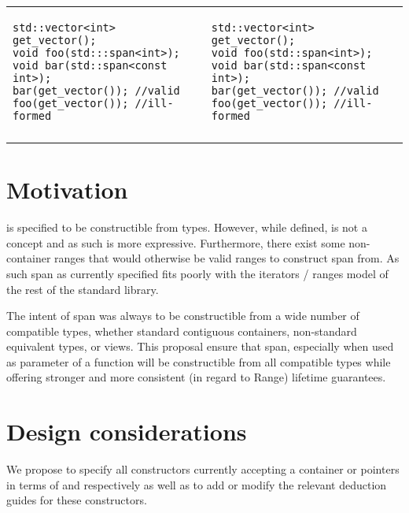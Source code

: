 \documentclass{wg21}
\begin{document}
\begin{center}
\begin{tabular}{l|l}
\begin{minipage}[t]{0.5\textwidth}
\begin{verbatim}
std::vector<int> get_vector();
void foo(std:::span<int>);
void bar(std::span<const int>);
bar(get_vector()); //valid
foo(get_vector()); //ill-formed
\end{verbatim}
\end{minipage}
&
\begin{minipage}[t]{0.5\textwidth}
\begin{verbatim}
std::vector<int> get_vector();
void foo(std::span<int>);
void bar(std::span<const int>);
bar(get_vector()); //valid
foo(get_vector()); //ill-formed
\end{verbatim}
\end{minipage}
\\\\ \hline
\end{tabular}
\end{center}


\section{Motivation}

 is specified to be constructible from  types.
However, while defined,  is not a concept and as such  is more expressive.
Furthermore, there exist some non-container ranges that would otherwise be valid ranges to construct span from.
As such span as currently specified fits poorly with the iterators / ranges model of the rest of the standard library.

The intent of span was always to be constructible from a wide number of compatible types, 
whether standard contiguous containers, non-standard equivalent types, or views.
This proposal ensure that span, especially when used as parameter of a function will be constructible 
from all compatible types while offering stronger and more consistent (in regard to Range) lifetime guarantees.


\section{Design considerations}

We propose to specify all constructors currently accepting a container or pointers in terms of  and 
respectively as well as to add or modify the relevant deduction guides for these constructors.
\end{document}
